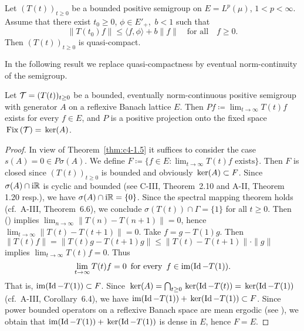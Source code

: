 \begin{proposition}\label{prop:c4-2.4}
%
%
%
Let $(T(t))_{t \geq 0}$ be a bounded positive semigroup on $E = L^{p}(\mu)$, $1 < p < \infty$.
Assume that there exist $t_{0} \geq 0$, $\phi \in E'_{+}$,\, $b < 1$ such that
\begin{equation}\label{eq:c4-2.4}
\|T(t_{0})f\| \leq \langle f,\phi \rangle + b\|f\| \quad \text{for all} \quad f \geq 0.
\end{equation}
Then $(T(t))_{t \geq 0}$ is quasi-compact.
\end{proposition}
In the following result we replace quasi-compactness by eventual norm-continuity of the semigroup.

\begin{theorem} \label{thm:c4-2.5}
%
%
%
Let $\mathcal{T} = (T(t))_{t \geq 0}$ be a bounded, eventually norm-continuous positive semigroup with generator $A$ on a reflexive Banach lattice $E$.
Then $Pf \coloneqq  \lim_{t \to \infty} T(t)f$ exists for every $f \in E$, and
$P$ is a positive projection onto the fixed space $\mathop{}\mathrm{Fix}\left(\mathcal{T}\right) = \mathop{}\mathrm{ker}(A)$. 
\end{theorem}
\begin{proof}
In view of Theorem~\ref{thm:c4-1.5} it suffices to consider the case $s(A) = 0 \in P{\sigma}(A)$.
We define $F \coloneqq \{f \in E \colon \lim_{t \to \infty} T(t)f \text{ exists}\}$.
Then $F$ is closed since $(T(t))_{t \geq 0}$ is bounded and obviously $\mathop{}\mathrm{ker}(A) \subset F$.
Since $\sigma(A) \cap \mathrm{i}\mathbb{R}$ is cyclic and bounded (see C-III, Theorem~2.10 and A-II, Theorem 1.20 resp.), we have $\sigma(A) \cap \mathrm{i}\mathbb{R} = \{0\}$.
Since the spectral mapping theorem holds (cf.\ A-III, Theorem~6.6), we conclude $\sigma(T(t)) \cap \Gamma = \{1\}$ for all $t \geq 0$.
Then () implies $\lim_{n \to \infty} \|T(n) - T(n+1)\| = 0$, hence $\lim_{t \to \infty}\|T(t) - T(t+1)\| = 0$.
Take $f = g - T(1)g$.
Then $\|T(t)f\| = \|T(t)g - T(t+1)g\| \leq \|T(t) - T(t+1)\| \cdot \|g\|$ implies $\lim_{t \to \infty} T(t)f = 0$.
Thus
\begin{equation}\label{eq:c4-2.5}
\lim_{t \to \infty} T(t)f = 0\, \text{ for every }\, f \in \text{im}(\operatorname{Id} - T(1)).
\end{equation}
That is, $\mathrm{im}(\operatorname{Id} - T(1)) \subset F$.
Since $\mathop{}\mathrm{ker}(A) = \bigcap_{t \geq 0} \mathop{}\mathrm{ker}(\operatorname{Id} - T(t)) = \mathop{}\mathrm{ker}(\operatorname{Id} - T(1))$ (cf.\ A-III, Corollary~6.4), we have $\text{im}(\operatorname{Id} - T(1)) + \mathop{}\mathrm{ker}(\operatorname{Id} - T(1)) \subset F$.
Since power bounded operators on a reflexive Banach space are mean ergodic (\eg  see \citet[Chapter~2, Theorem~1.2]{krengel:1985}), we obtain that $\text{im}(\operatorname{Id} - T(1)) + \mathop{}\mathrm{ker}(\operatorname{Id} - T(1))$ is dense in $E$, hence $F = E$.
\end{proof}
